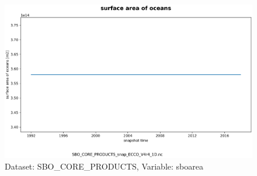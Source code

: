 \begin{figure}[H]
\centering
\includegraphics[scale=0.55]{../images/plots/v4r4/oneD_plots/SBO_Core_Products/sboarea.png}
\caption{Dataset: SBO\_CORE\_PRODUCTS, Variable: sboarea}
\label{tab:table-SBO_CORE_PRODUCTS_sboarea-Plot}
\end{figure}
\newpage
\pagebreak
